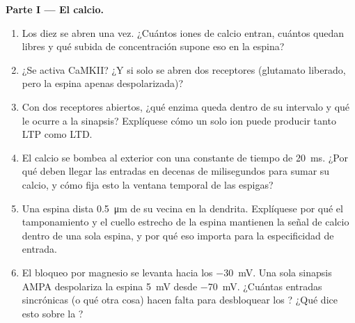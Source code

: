 \begin{problem}
\medskip
\noindent\textbf{Parte I --- El calcio.}
\begin{enumerate}
  \item Los diez  se abren una vez. ¿Cuántos iones de
        calcio entran, cuántos quedan libres y qué subida de
        concentración supone eso en la espina?
  \item ¿Se activa CaMKII? ¿Y si solo se abren dos receptores
        (glutamato liberado, pero la espina apenas despolarizada)?
  \item Con dos receptores abiertos, ¿qué enzima queda dentro de su
        intervalo y qué le ocurre a la sinapsis? Explíquese cómo un
        solo ion puede producir tanto LTP como LTD.
  \item El calcio se bombea al exterior con una constante de tiempo de
        \qty{20}{ms}. ¿Por qué deben llegar las entradas en decenas de
        milisegundos para sumar su calcio, y cómo fija esto la ventana
        temporal de las espigas?
  \item Una espina dista \qty{0.5}{\micro m} de su vecina en la
        dendrita. Explíquese por qué el tamponamiento y el cuello
        estrecho de la espina mantienen la señal de calcio dentro de
        una sola espina, y por qué eso importa para la especificidad de
        entrada.
  \item El bloqueo por magnesio se levanta hacia los \qty{-30}{mV}. Una
        sola sinapsis AMPA despolariza la espina \qty{5}{mV} desde
        \qty{-70}{mV}. ¿Cuántas entradas sincrónicas (o qué otra cosa)
        hacen falta para desbloquear los ? ¿Qué dice
        esto sobre la ?
\end{enumerate}


\end{problem}
